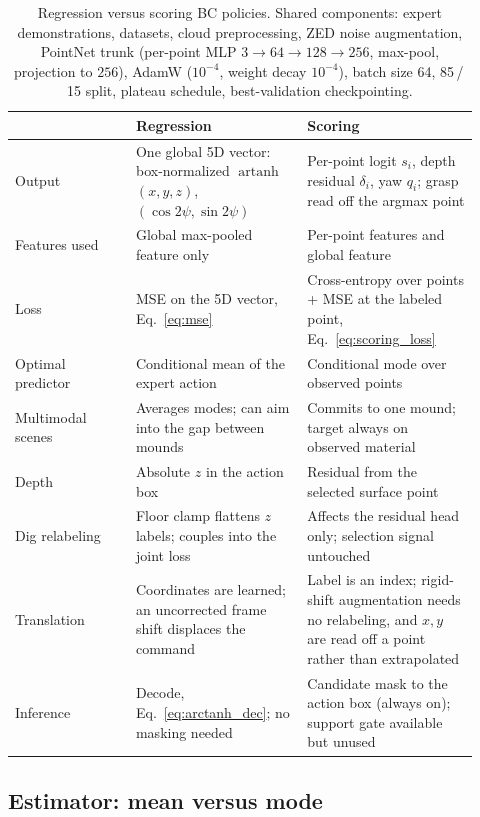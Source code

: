 \begin{table}[t]
\centering
\caption{Regression versus scoring BC policies. Shared components: expert
demonstrations, datasets, cloud preprocessing, ZED noise augmentation,
PointNet trunk (per-point MLP $3 \to 64 \to 128 \to 256$, max-pool, projection
to $256$), AdamW ($10^{-4}$, weight decay $10^{-4}$), batch size 64,
85\,/\,15 split, plateau schedule, best-validation checkpointing.}
\label{tab:bc_differences}
\begin{tabular}{p{0.24\linewidth} p{0.34\linewidth} p{0.34\linewidth}}
\hline
 & \textbf{Regression} & \textbf{Scoring} \\
\hline
Output & One global 5D vector: box-normalized $\operatorname{artanh}$ $(x,y,z)$, $(\cos 2\psi, \sin 2\psi)$ & Per-point logit $s_i$, depth residual $\delta_i$, yaw $q_i$; grasp read off the argmax point \\
Features used & Global max-pooled feature only & Per-point features and global feature \\
Loss & MSE on the 5D vector, Eq.~\eqref{eq:mse} & Cross-entropy over points + MSE at the labeled point, Eq.~\eqref{eq:scoring_loss} \\
Optimal predictor & Conditional mean of the expert action & Conditional mode over observed points \\
Multimodal scenes & Averages modes; can aim into the gap between mounds & Commits to one mound; target always on observed material \\
Depth & Absolute $z$ in the action box & Residual from the selected surface point \\
Dig relabeling & Floor clamp flattens $z$ labels; couples into the joint loss & Affects the residual head only; selection signal untouched \\
Translation & Coordinates are learned; an uncorrected frame shift displaces the command & Label is an index; rigid-shift augmentation needs no relabeling, and $x, y$ are read off a point rather than extrapolated \\
Inference & Decode, Eq.~\eqref{eq:arctanh_dec}; no masking needed & Candidate mask to the action box (always on); support gate available but unused \\
\hline
\end{tabular}
\end{table}

\subsection{Estimator: mean versus mode}

